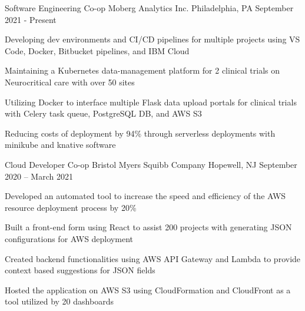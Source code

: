 

\begin{cventries}

  
	\cventry
	{Software Engineering Co-op}
	{Moberg Analytics Inc.}
	{Philadelphia, PA}
	{September 2021 - Present}
	{\begin{cvitems}
		\item {Developing dev environments and CI/CD pipelines for multiple projects using VS Code, Docker, Bitbucket pipelines, and IBM Cloud}
		\item {Maintaining a Kubernetes data-management platform for 2 clinical trials on Neurocritical care with over 50 sites}
		\item {Utilizing Docker to interface multiple Flask data upload portals for clinical trials with Celery task queue, PostgreSQL DB, and AWS S3}
		\item {Reducing costs of deployment by 94\% through serverless deployments with minikube and knative software}
		\end{cvitems}}
	

	\vspace{-2mm}
	\cventry
	{Cloud Developer Co-op}
	{Bristol Myers Squibb Company}
	{Hopewell, NJ}
	{September 2020 – March 2021}
	{\begin{cvitems}
		\item {Developed an automated tool to increase the speed and efficiency of the AWS resource deployment process by 20\% }
        \item {Built a front-end form using React to assist 200 projects with generating JSON configurations for AWS deployment}
        \item {Created backend functionalities using AWS API Gateway and Lambda to provide context based suggestions for JSON fields}
        \item {Hosted the application on AWS S3 using CloudFormation and CloudFront as a tool utilized by 20 dashboards}
		\end{cvitems}}
	

\end{cventries}
